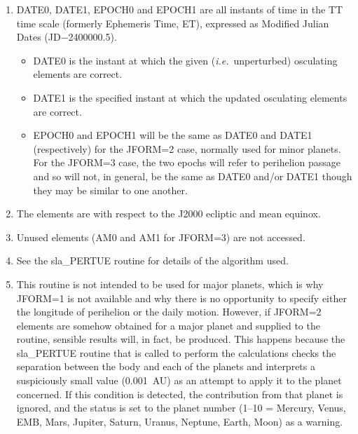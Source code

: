 \documentclass[11pt,twoside]{article}
\begin{document}
{\begin{enumerate}
        \begin{tabbing}
        xxx \= xxxxxxxx \= xx \= \kill
        \> EPOCH  \> = \> epoch of perihelion $T$ (TT MJD) \\
        \> ORBINC \> = \> inclination $i$ (radians) \\
        \> ANODE  \> = \> longitude of the ascending node $\Omega$ (radians) \\
        \> PERIH  \> = \> argument of perihelion $\omega$ (radians) \\
        \> AORQ   \> = \> perihelion distance $q$ (AU) \\
        \> E      \> = \> eccentricity $e$ $( 0 \leq e \leq 10 )$
        \end{tabbing}
 \item DATE0, DATE1, EPOCH0 and EPOCH1 are all instants of time in
       the TT time scale (formerly Ephemeris Time, ET), expressed
       as Modified Julian Dates (JD$-$2400000.5).
       \begin{itemize}
       \item DATE0 is the instant at which the given
             ({\it i.e.}\ unperturbed) osculating elements are correct.
       \item DATE1 is the specified instant at which the updated osculating
             elements are correct.
       \item EPOCH0 and EPOCH1 will be the same as DATE0 and DATE1
             (respectively) for the JFORM=2 case, normally used for minor
             planets.  For the JFORM=3 case, the two epochs will refer to
             perihelion passage and so will not, in general, be the same as
             DATE0 and/or DATE1 though they may be similar to one another.
       \end{itemize}
 \item The elements are with respect to the J2000 ecliptic and mean equinox.
 \item Unused elements (AM0 and AM1 for JFORM=3) are not accessed.
 \item See the sla\_PERTUE routine for details of the algorithm used.
 \item This routine is not intended to be used for major planets, which
       is why JFORM=1 is not available and why there is no opportunity
       to specify either the longitude of perihelion or the daily
       motion.  However, if JFORM=2 elements are somehow obtained for a
       major planet and supplied to the routine, sensible results will,
       in fact, be produced.  This happens because the sla\_PERTUE routine
       that is called to perform the calculations checks the separation
       between the body and each of the planets and interprets a
       suspiciously small value (0.001~AU) as an attempt to apply it to
       the planet concerned.  If this condition is detected, the
       contribution from that planet is ignored, and the status is set to
       the planet number (1--10 = Mercury, Venus, EMB, Mars, Jupiter,
       Saturn, Uranus, Neptune, Earth, Moon) as a warning.
 \end{enumerate}
}
\end{document}
